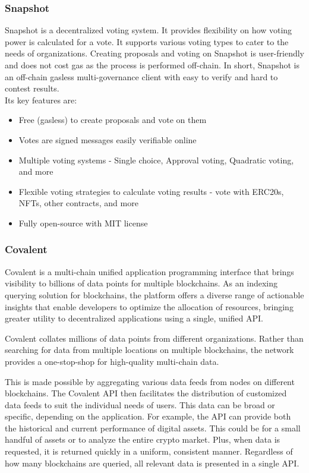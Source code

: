 \documentclass[MSE,Master,english]{twbook}%
\begin{document}
\subsubsection{Snapshot}
Snapshot\cite{snapshot} is a decentralized voting system. It provides flexibility on how voting power is calculated for a vote. It supports various voting types to cater to the needs of organizations. Creating proposals and voting on Snapshot is user-friendly and does not cost gas as the process is performed off-chain.
In short, Snapshot is an off-chain gasless multi-governance client with easy to verify and hard to contest results. \\

Its key features are:
\begin{itemize}
  \item Free (gasless) to create proposals and vote on them
  \item Votes are signed messages easily verifiable online
  \item Multiple voting systems - Single choice, Approval voting, Quadratic voting, and more
  \item Flexible voting strategies to calculate voting results - vote with ERC20s, NFTs, other contracts, and more
  \item Fully open-source with MIT license
\end{itemize}

\subsubsection{Covalent}
Covalent\cite{covalent} is a multi-chain unified application programming interface that brings visibility to billions of data points for multiple blockchains. As an indexing querying solution for blockchains, the platform offers a diverse range of actionable insights that enable developers to optimize the allocation of resources, bringing greater utility to decentralized applications using a single, unified API.

Covalent collates millions of data points from different organizations. Rather than searching for data from multiple locations on multiple blockchains, the network provides a one-stop-shop for high-quality multi-chain data.\cite{covalent}

This is made possible by aggregating various data feeds from nodes on different blockchains. The Covalent API then facilitates the distribution of customized data feeds to suit the individual needs of users. This data can be broad or specific, depending on the application. For example, the API can provide both the historical and current performance of digital assets. This could be for a small handful of assets or to analyze the entire crypto market. Plus, when data is requested, it is returned quickly in a uniform, consistent manner. Regardless of how many blockchains are queried, all relevant data is presented in a single API.\cite{covalent}
\end{document}
